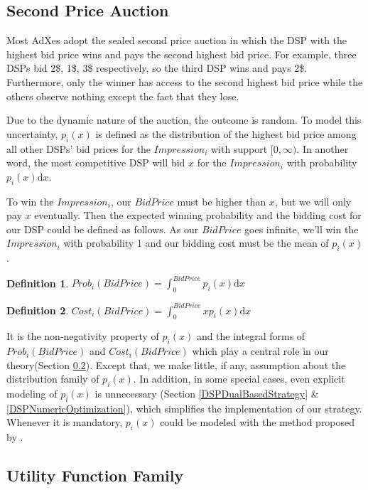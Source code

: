 \documentclass{article}
\newtheorem{definition}{Definition}[section]
\begin{document}
\subsection{Second Price Auction} \label{SecondPriceAuction}

Most AdXes adopt the sealed second price auction in which
    the DSP with the highest bid price wins and pays the second highest bid price.
For example, three DSPs bid 2\$, 1\$, 3\$ respectively, so the third DSP wins and pays 2\$. 
Furthermore, only the winner has access to the second highest bid price
    while the others observe nothing except the fact that they lose.

Due to the dynamic nature of the auction, the outcome is random.
To model this uncertainty, $p_i(x)$ is defined as the distribution of
    the highest bid price among all other DSPs' bid prices for the $Impression_i$ with support $[0, \infty)$.
In another word, the most competitive DSP will bid $x$ for the $Impression_i$ with probability $p_i(x) \mathrm{d} x$.

To win the $Impression_i$, our $BidPrice$ must be higher than $x$, but we will only pay $x$ eventually.
Then the expected winning probability and the bidding cost for our DSP could be defined as follows.
As our $BidPrice$ goes infinite, we'll win the $Impression_i$ with probability 1 and our bidding cost must be the mean of $p_i(x)$.

\begin{definition}
$Prob_i(BidPrice)= \int_0^{BidPrice} p_i(x) \mathrm{d} x$
\end{definition}

\begin{definition}
$Cost_i(BidPrice)= \int_0^{BidPrice} x p_i(x) \mathrm{d} x$
\end{definition}

It is the non-negativity property of $p_i(x)$ and the integral forms of $Prob_i(BidPrice)$ and $Cost_i(BidPrice)$
    which play a central role in our theory(Section \ref{UtilityFunctionFamily}).
Except that, we make little, if any, assumption about the distribution family of $p_i(x)$.
In addition, in some special cases, even explicit modeling of $p_i(x)$ is unnecessary
    (Section \ref{DSPDualBasedStrategy} \& \ref{DSPNumericOptimization}), which simplifies the implementation of our strategy.
Whenever it is mandatory, $p_i(x)$ could be modeled with the method proposed by \cite{Wu2015}.

\subsection{Utility Function Family} \label{UtilityFunctionFamily}
\end{document}
